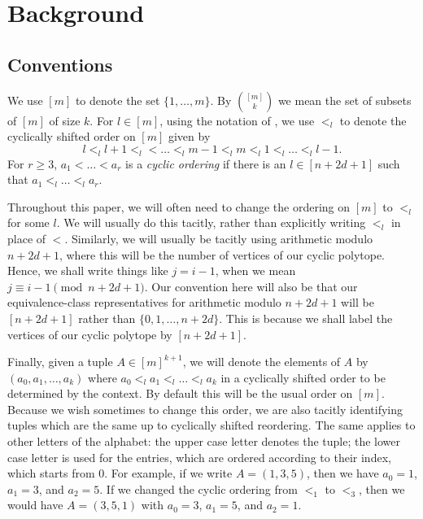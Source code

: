 \section{Background}\label{sect:back}

\subsection{Conventions}

We use $[m]$ to denote the set $\{1, \dots, m\}$. By $\binom{[m]}{k}$ we mean the set of subsets of $[m]$ of size $k$. For $l \in [m]$, using the notation of \cite{ops}, we use $<_{l}$ to denote the cyclically shifted order on $[m]$ given by \[l <_{l} l+1 <_{l} < \dots <_{l} m-1 <_{l} m <_{l} 1 <_{l} \dots <_{l} l-1 .\] For $r \geqslant 3$, $a_{1} < \dots < a_{r}$ is a \emph{cyclic ordering} if there is an $l \in [n + 2d + 1]$ such that $a_{1} <_{l} \dots <_{l} a_{r}$.

Throughout this paper, we will often need to change the ordering on $[m]$ to $<_{l}$ for some $l$. We will usually do this tacitly, rather than explicitly writing $<_{l}$ in place of $<$. Similarly, we will usually be tacitly using arithmetic modulo $n + 2d + 1$, where this will be the number of vertices of our cyclic polytope. Hence, we shall write things like $j = i - 1$, when we mean $j \equiv i - 1 \pmod{n + 2d + 1}$. Our convention here will also be that our equivalence-class representatives for arithmetic modulo $n + 2d + 1$ will be $[n + 2d + 1]$ rather than $\{0, 1, \dots, n + 2d\}$. This is because we shall label the vertices of our cyclic polytope by $[n + 2d + 1]$.

Finally, given a tuple $A \in [m]^{k + 1}$, we will denote the elements of $A$ by $(a_{0}, a_{1}, \dots, a_{k})$ where $a_{0} <_{l} a_{1} <_{l} \dots <_{l} a_{k}$ in a cyclically shifted order to be determined by the context. By default this will be the usual order on $[m]$. Because we wish sometimes to change this order, we are also tacitly identifying tuples which are the same up to cyclically shifted reordering. The same applies to other letters of the alphabet: the upper case letter denotes the tuple; the lower case letter is used for the entries, which are ordered according to their index, which starts from 0. For example, if we write $A = (1, 3, 5)$, then we have $a_{0} = 1$, $a_{1} = 3$, and $a_{2} = 5$. If we changed the cyclic ordering from $<_{1}$ to $<_{3}$, then we would have $A = (3, 5, 1)$ with $a_{0} = 3$, $a_{1} = 5$, and $a_{2} = 1$.

